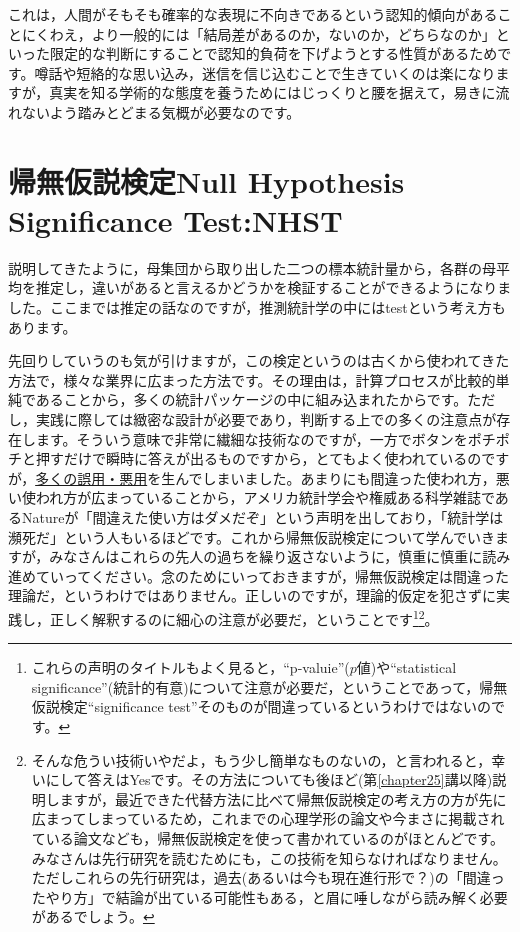 \documentclass{ltjsbook}
\begin{document}
これは，人間がそもそも確率的な表現に不向きであるという認知的傾向があることにくわえ，より一般的には「結局差があるのか，ないのか，どちらなのか」といった限定的な判断にすることで認知的負荷を下げようとする性質があるためです。噂話や短絡的な思い込み，迷信を信じ込むことで生きていくのは楽になりますが，真実を知る学術的な態度を養うためにはじっくりと腰を据えて，易きに流れないよう踏みとどまる気概が必要なのです。

\section{帰無仮説検定Null Hypothesis Significance Test:NHST}
説明してきたように，母集団から取り出した二つの標本統計量から，各群の母平均を推定し，違いがあると言えるかどうかを検証することができるようになりました。ここまでは推定の話なのですが，推測統計学の中にはtestという考え方もあります。

先回りしていうのも気が引けますが，この検定というのは古くから使われてきた方法で，様々な業界に広まった方法です。その理由は，計算プロセスが比較的単純であることから，多くの統計パッケージの中に組み込まれたからです。ただし，実践に際しては緻密な設計が必要であり，判断する上での多くの注意点が存在します。そういう意味で非常に繊細な技術なのですが，一方でボタンをポチポチと押すだけで瞬時に答えが出るものですから，とてもよく使われているのですが，\underline{多くの誤用・悪用}を生んでしまいました。あまりにも間違った使われ方，悪い使われ方が広まっていることから，アメリカ統計学会や権威ある科学雑誌であるNatureが「間違えた使い方はダメだぞ」という声明を出しており\citep{wasserstein2016asa,amrhein2019scientists}，「統計学は瀕死だ」という人もいるほどです\citep{豊田202003}。これから帰無仮説検定について学んでいきますが，みなさんはこれらの先人の過ちを繰り返さないように，慎重に慎重に読み進めていってください。念のためにいっておきますが，帰無仮説検定は間違った理論だ，というわけではありません。正しいのですが，理論的仮定を犯さずに実践し，正しく解釈するのに細心の注意が必要だ，ということです\footnote{これらの声明のタイトルもよく見ると，``p-valuie''($p$値)や``statistical significance''(統計的有意)について注意が必要だ，ということであって，帰無仮説検定``significance test''そのものが間違っているというわけではないのです。}\footnote{そんな危うい技術いやだよ，もう少し簡単なものないの，と言われると，幸いにして答えはYesです。その方法についても後ほど(第\ref{chapter25}講以降)説明しますが，最近できた代替方法に比べて帰無仮説検定の考え方の方が先に広まってしまっているため，これまでの心理学形の論文や今まさに掲載されている論文なども，帰無仮説検定を使って書かれているのがほとんどです。みなさんは先行研究を読むためにも，この技術を知らなければなりません。ただしこれらの先行研究は，過去(あるいは今も現在進行形で？)の「間違ったやり方」で結論が出ている可能性もある，と眉に唾しながら読み解く必要があるでしょう。}。
\end{document}
